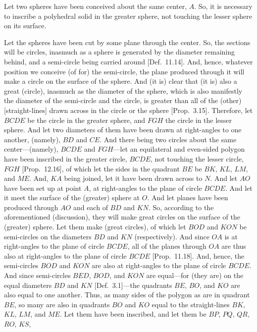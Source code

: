 Let two spheres have been conceived about the same center, $A$. So, it is necessary to inscribe a polyhedral solid in the greater
sphere, not touching the lesser sphere on its surface.

Let the spheres have been cut by some plane through the center. So, the sections will be circles, inasmuch as a sphere is generated by  the diameter remaining behind,
and a semi-circle being carried around [Def.~11.14]. And, hence,  whatever position we
conceive  (of for) the semi-circle, the  plane produced through it will  make a circle on the surface of the sphere. And (it is) clear
that (it is) also a great (circle), inasmuch as the diameter of the sphere, which is also manifestly the  diameter of  the semi-circle
and the circle, is greater than  all of the (other)  [straight-lines] drawn across in the circle or the sphere [Prop.~3.15]. Therefore, let $BCDE$ be the circle in the greater sphere, and $FGH$ the circle in the lesser sphere. And let two diameters of them have been drawn
at right-angles to one another, (namely), $BD$ and $CE$. And there being two circles about the same center---(namely), $BCDE$
and $FGH$---let an equilateral and even-sided polygon have been inscribed in the greater circle, $BCDE$, not touching the
lesser circle, $FGH$ [Prop.~12.16], of which let the sides in the quadrant $BE$ be
$BK$, $KL$, $LM$, and $ME$. And, $KA$ being joined, let it have been drawn across to $N$. And let $AO$ have been
set up at point $A$, at right-angles to the plane of circle $BCDE$. And let it meet the surface of the (greater) sphere at $O$. 
And let planes have been produced through  $AO$ and each of $BD$  and $KN$. So, according to the aforementioned (discussion),
they will make great circles on the surface of the (greater) sphere. Let them make (great circles), of which let $BOD$ and $KON$
be semi-circles on the diameters $BD$ and $KN$ (respectively). And since $OA$ is at right-angles
to the plane of circle $BCDE$,  all of the planes through $OA$ are thus also at right-angles to the plane of circle $BCDE$
[Prop.~11.18]. And, hence, the semi-circles $BOD$ and $KON$ are also at right-angles to the
plane of circle $BCDE$. And since semi-circles $BED$, $BOD$, and $KON$ are equal---for (they are) on the
equal diameters $BD$ and $KN$ [Def.~3.1]---the quadrants $BE$, $BO$, and $KO$ are also equal to one another. Thus, as many
sides of the polygon as are in quadrant $BE$, so many are also in quadrants $BO$ and $KO$ equal to the straight-lines
$BK$, $KL$, $LM$, and $ME$. Let them have been inscribed, and let them be $BP$, $PQ$, $QR$, $RO$, $KS$,
